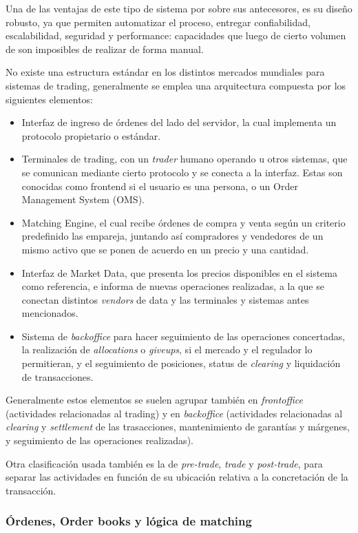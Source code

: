 Una de las ventajas de este tipo de sistema por sobre sus antecesores, es su
diseño robusto, ya que permiten automatizar el proceso, entregar confiabilidad,
escalabilidad, seguridad y performance: capacidades que luego de cierto volumen
de son imposibles de realizar de forma manual.

No existe una estructura estándar en los distintos mercados mundiales para
sistemas de trading, generalmente se emplea una arquitectura compuesta por los
siguientes elementos:
\begin{itemize}
 \item Interfaz de ingreso de órdenes del lado del servidor, la cual implementa
un protocolo propietario o estándar.
 \item Terminales de trading, con un \emph{trader} humano operando u otros
sistemas, que se comunican mediante cierto protocolo y se conecta a la
interfaz. Estas son conocidas como frontend si el usuario es una persona, o un
Order Management System (OMS).
 \item Matching Engine, el cual recibe órdenes de compra y venta según un
criterio predefinido las empareja, juntando así compradores y vendedores de un
mismo activo que se ponen de acuerdo en un precio y una cantidad.
 \item Interfaz de Market Data, que presenta los precios disponibles en el
sistema como referencia, e informa de nuevas operaciones realizadas, a la que
se conectan distintos \emph{vendors} de data y las terminales y sistemas antes
mencionados.
 \item Sistema de \emph{backoffice} para hacer seguimiento de las operaciones
concertadas, la realización de \emph{allocations} o \emph{giveups}, si el
mercado y el regulador lo permitieran, y el seguimiento de posiciones, status
de \emph{clearing} y liquidación de transacciones.
\end{itemize}

Generalmente estos elementos se suelen agrupar también en \emph{frontoffice}
(actividades relacionadas al trading) y en \emph{backoffice} (actividades
relacionadas al \emph{clearing} y \emph{settlement} de las trasacciones,
mantenimiento de garantías y márgenes, y seguimiento de las operaciones
realizadas).

Otra clasificación usada también es la de \emph{pre-trade}, \emph{trade} y
\emph{post-trade}, para separar las actividades en función de su ubicación
relativa a la concretación de la transacción.


\subsubsection{Órdenes, Order books y lógica de matching}

